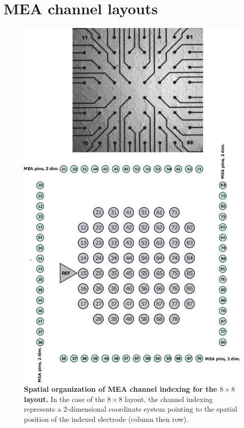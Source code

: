 \newpage
\section{MEA channel layouts}
       \begin{figure}[!h]
            \centering
            \includegraphics{appendix/8x8Layout.png}
            \caption[Spatial organization of MEA channel indexing for the \(8\times 8\) layout]{\textbf{Spatial organization of MEA channel indexing for the \(8\times 8\) layout.} In the case of the \(8 \times 8\) layout, the channel indexing represents a 2-dimensional coordinate system pointing to the spatial position of the indexed electrode (column then row).}
            \label{fig:app:8x8Layout}

        \end{figure}
